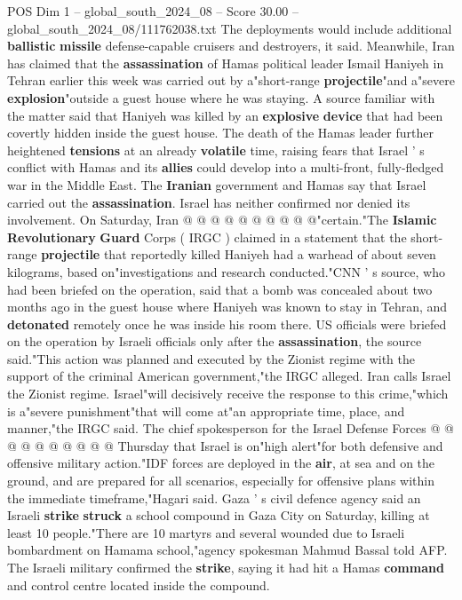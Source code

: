 \begin{textsample}{POS Dim 1 – global\_south\_2024\_08 – Score 30.00 – global\_south\_2024\_08/111762038.txt}
The deployments would include additional \textbf{ballistic} \textbf{missile} defense-capable cruisers and destroyers, it said.
Meanwhile, Iran has claimed that the \textbf{assassination} of Hamas political leader Ismail Haniyeh in Tehran earlier this week was carried out by a"short-range \textbf{projectile}"and a"severe \textbf{explosion}"outside a guest house where he was staying.
A source familiar with the matter said that Haniyeh was killed by an \textbf{explosive} \textbf{device} that had been covertly hidden inside the guest house.
The death of the Hamas leader further heightened \textbf{tensions} at an already \textbf{volatile} time, raising fears that Israel ' s conflict with Hamas and its \textbf{allies} could develop into a multi-front, fully-fledged war in the Middle East.
The \textbf{Iranian} government and Hamas say that Israel carried out the \textbf{assassination}.
Israel has neither confirmed nor denied its involvement.
On Saturday, Iran @ @ @ @ @ @ @ @ @ @"certain."The \textbf{Islamic} \textbf{Revolutionary} \textbf{Guard} Corps ( IRGC ) claimed in a statement that the short-range \textbf{projectile} that reportedly killed Haniyeh had a warhead of about seven kilograms, based on"investigations and research conducted."CNN ' s source, who had been briefed on the operation, said that a bomb was concealed about two months ago in the guest house where Haniyeh was known to stay in Tehran, and \textbf{detonated} remotely once he was inside his room there.
US officials were briefed on the operation by Israeli officials only after the \textbf{assassination}, the source said."This action was planned and executed by the Zionist regime with the support of the criminal American government,"the IRGC alleged.
Iran calls Israel the Zionist regime.
Israel"will decisively receive the response to this crime,"which is a"severe punishment"that will come at"an appropriate time, place, and manner,"the IRGC said.
The chief spokesperson for the Israel Defense Forces @ @ @ @ @ @ @ @ @ @ Thursday that Israel is on"high alert"for both defensive and offensive military action."IDF forces are deployed in the \textbf{air}, at sea and on the ground, and are prepared for all scenarios, especially for offensive plans within the immediate timeframe,"Hagari said.
Gaza ' s civil defence agency said an Israeli \textbf{strike} \textbf{struck} a school compound in Gaza City on Saturday, killing at least 10 people."There are 10 martyrs and several wounded due to Israeli bombardment on Hamama school,"agency spokesman Mahmud Bassal told AFP.
The Israeli military confirmed the \textbf{strike}, saying it had hit a Hamas \textbf{command} and control centre located inside the compound.

\end{textsample}
